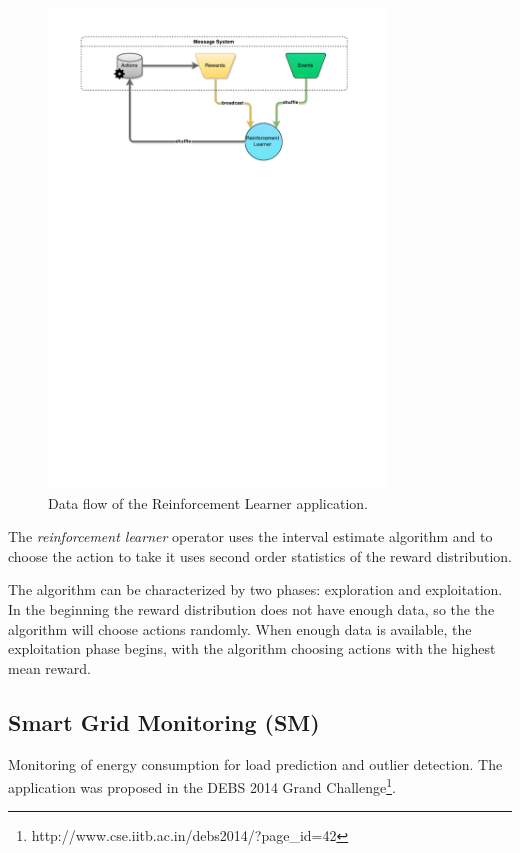 \documentclass[ppgc,diss,english]{iiufrgs}
\begin{document}
\begin{figure}[!ht]
	\centering
	\includegraphics[width=0.8\textwidth]{images/apps/ReinforcementLearner.pdf}
	\caption{Data flow of the Reinforcement Learner application.}
	\label{fig:app_reinforcement_learner}
\end{figure}

The \textit{reinforcement learner} operator uses the interval estimate \cite{strehl2008analysis} algorithm and to choose the action to take it uses second order statistics of the reward distribution.

The algorithm can be characterized by two phases: exploration and exploitation. In the beginning the reward distribution does not have enough data, so the the algorithm will choose actions randomly. When enough data is available, the exploitation phase begins, with the algorithm choosing actions with the highest mean reward.

\subsection{Smart Grid Monitoring (SM)}

Monitoring of energy consumption for load prediction and outlier detection. The application was proposed in the DEBS 2014 Grand Challenge\footnote{http://www.cse.iitb.ac.in/debs2014/?page\_id=42}.
\end{document}
